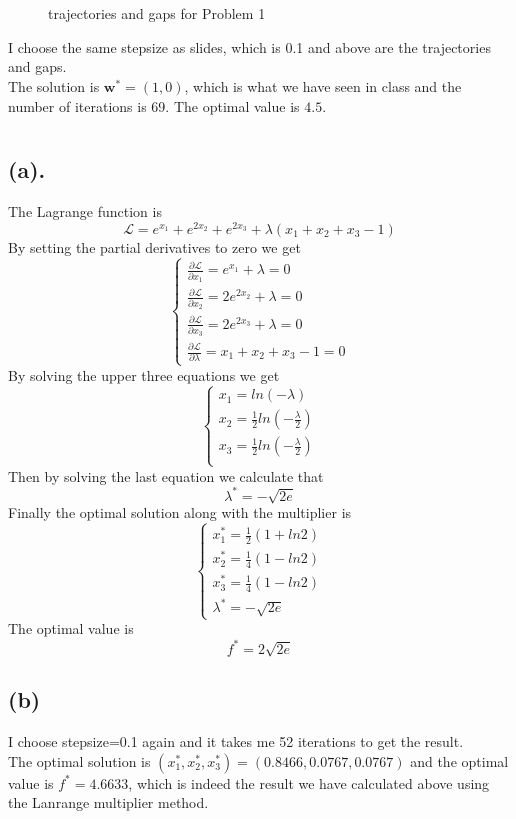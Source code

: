 \documentclass[12pt,letterpaper]{article}
\begin{document}
\section{}
\begin{figure}[htbp]
\centering
{}
\caption{trajectories and gaps for Problem 1}
\label{trandgap1a}
\end{figure}
I choose the same stepsize as slides, which is 0.1 and above are the trajectories and gaps.\\
The solution is $\boldsymbol{w}^*=(1,0)$, which is what we have seen in class and the number of iterations is 69. The optimal value is $4.5$.
\section{}
\subsection*{(a).}
The Lagrange function is 
$$\mathcal{L}=e^{x_1}+e^{2x_2}+e^{2x_3}+\lambda(x_1+x_2+x_3-1)$$
By setting the partial derivatives to zero we get 
$$\begin{cases}
\frac{\partial\mathcal{L}}{\partial x_1}=e^{x_1}+\lambda=0\\
\frac{\partial\mathcal{L}}{\partial x_2}=2e^{2x_2}+\lambda=0\\
\frac{\partial\mathcal{L}}{\partial x_3}=2e^{2x_3}+\lambda=0\\
\frac{\partial\mathcal{L}}{\partial\lambda}=x_1+x_2+x_3-1=0
\end{cases}$$
By solving the upper three equations we get
$$\begin{cases}
x_1=ln(-\lambda)\\
x_2=\frac{1}{2}ln(-\frac{\lambda}{2})\\
x_3=\frac{1}{2}ln(-\frac{\lambda}{2})\\
\end{cases}$$
Then by solving the last equation we calculate that 
$$\lambda^*=-\sqrt{2e}$$
Finally the optimal solution along with the multiplier is 
$$\begin{cases}
x_1^*=\frac{1}{2}(1+ln2)\\
x_2^*=\frac{1}{4}(1-ln2)\\
x_3^*=\frac{1}{4}(1-ln2)\\
\lambda^*=-\sqrt{2e}
\end{cases}$$
The optimal value is 
$$f^*=2\sqrt{2e}$$

\subsection*{(b)}
I choose stepsize=0.1 again and it takes me 52 iterations to get the result.\\
The optimal solution is $(x_1^*,x_2^*,x_3^*)=(0.8466, 0.0767, 0.0767)$ and the optimal value is $f^*=4.6633$, which is indeed the result we have calculated above using the Lanrange multiplier method.
\end{document}
